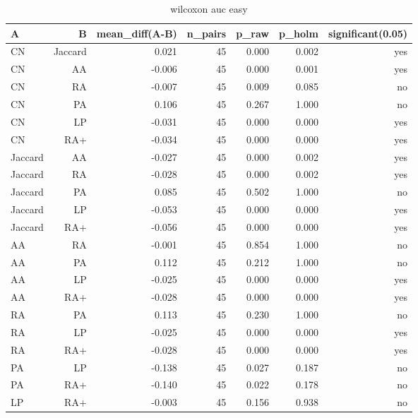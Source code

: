 \begin{table}[t]
\centering
\caption{wilcoxon auc easy}
\label{tab:wilcoxon_auc_easy}
\begin{tabular}{lrrrrrr}
\hline
A & B & mean\_diff(A-B) & n\_pairs & p\_raw & p\_holm & significant(0.05) \\
\hline
CN & Jaccard & 0.021 & 45 & 0.000 & 0.002 & yes \\
CN & AA & -0.006 & 45 & 0.000 & 0.001 & yes \\
CN & RA & -0.007 & 45 & 0.009 & 0.085 & no \\
CN & PA & 0.106 & 45 & 0.267 & 1.000 & no \\
CN & LP & -0.031 & 45 & 0.000 & 0.000 & yes \\
CN & RA+ & -0.034 & 45 & 0.000 & 0.000 & yes \\
Jaccard & AA & -0.027 & 45 & 0.000 & 0.002 & yes \\
Jaccard & RA & -0.028 & 45 & 0.000 & 0.002 & yes \\
Jaccard & PA & 0.085 & 45 & 0.502 & 1.000 & no \\
Jaccard & LP & -0.053 & 45 & 0.000 & 0.000 & yes \\
Jaccard & RA+ & -0.056 & 45 & 0.000 & 0.000 & yes \\
AA & RA & -0.001 & 45 & 0.854 & 1.000 & no \\
AA & PA & 0.112 & 45 & 0.212 & 1.000 & no \\
AA & LP & -0.025 & 45 & 0.000 & 0.000 & yes \\
AA & RA+ & -0.028 & 45 & 0.000 & 0.000 & yes \\
RA & PA & 0.113 & 45 & 0.230 & 1.000 & no \\
RA & LP & -0.025 & 45 & 0.000 & 0.000 & yes \\
RA & RA+ & -0.028 & 45 & 0.000 & 0.000 & yes \\
PA & LP & -0.138 & 45 & 0.027 & 0.187 & no \\
PA & RA+ & -0.140 & 45 & 0.022 & 0.178 & no \\
LP & RA+ & -0.003 & 45 & 0.156 & 0.938 & no \\
\hline
\end{tabular}
\end{table}